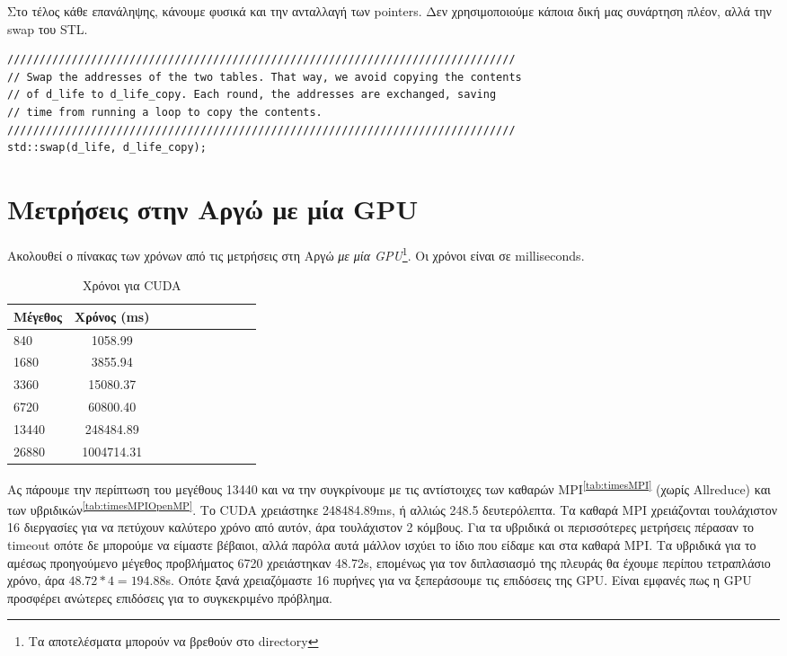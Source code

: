 Στο τέλος κάθε επανάληψης, κάνουμε φυσικά και την ανταλλαγή των pointers. Δεν χρησιμοποιούμε κάποια δική μας συνάρτηση πλέον, αλλά την swap του STL.

\begin{tcolorbox}
\begin{verbatim}
///////////////////////////////////////////////////////////////////////////////
// Swap the addresses of the two tables. That way, we avoid copying the contents
// of d_life to d_life_copy. Each round, the addresses are exchanged, saving
// time from running a loop to copy the contents.
///////////////////////////////////////////////////////////////////////////////
std::swap(d_life, d_life_copy);
\end{verbatim}
\end{tcolorbox}

\section{Μετρήσεις στην Αργώ με μία GPU}

Ακολουθεί ο πίνακας των χρόνων από τις μετρήσεις στη Αργώ \emph{με μία GPU}\footnote{Τα αποτελέσματα μπορούν να βρεθούν στο directory }. Οι χρόνοι είναι σε milliseconds.
\begin{table}[H]
\centering
\small
\begin{tabular}{| l | c | c | c | c | c | c | c | c | c |}
\hline
Μέγεθος & Χρόνος (\si{\milli\second}) \\
\hline
840 & 1058.99 \\
\hline
1680 & 3855.94 \\
\hline
3360 & 15080.37 \\
\hline
6720 &  60800.40 \\
\hline
13440 & 248484.89 \\
\hline
26880 & 1004714.31 \\
\hline
\end{tabular}
\caption{Χρόνοι για CUDA}
\label{tab:timesCUDA}
\end{table}
\begin{multicols}{2}
Ας πάρουμε την περίπτωση του μεγέθους 13440 και να την συγκρίνουμε με τις αντίστοιχες των καθαρών MPI\textsuperscript{\ref{tab:timesMPI}} (χωρίς Allreduce) και των υβριδικών\textsuperscript{\ref{tab:timesMPIOpenMP}}. Το CUDA χρειάστηκε 248484.89\si{\milli\second}, ή αλλιώς 248.5 δευτερόλεπτα. Τα καθαρά MPI χρειάζονται τουλάχιστον 16 διεργασίες για να πετύχουν καλύτερο χρόνο από αυτόν, άρα τουλάχιστον 2 κόμβους. Για τα υβριδικά οι περισσότερες μετρήσεις πέρασαν το timeout οπότε δε μπορούμε να είμαστε βέβαιοι, αλλά παρόλα αυτά μάλλον ισχύει το ίδιο που είδαμε και στα καθαρά MPI. Τα υβριδικά για το αμέσως προηγούμενο μέγεθος προβλήματος 6720 χρειάστηκαν 48.72\si{\second}, επομένως για τον διπλασιασμό της πλευράς θα έχουμε περίπου τετραπλάσιο χρόνο, άρα $48.72 * 4 = 194.88$\si{\second}. Οπότε ξανά χρειαζόμαστε 16 πυρήνες για να ξεπεράσουμε τις επιδόσεις της GPU. Είναι εμφανές πως η GPU προσφέρει ανώτερες επιδόσεις για το συγκεκριμένο πρόβλημα.
\end{multicols}
